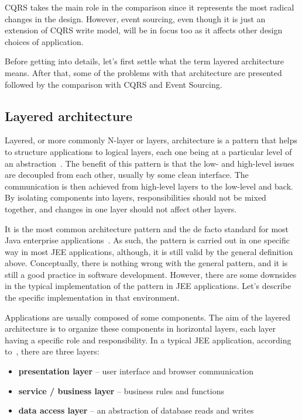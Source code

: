 \documentclass{book}
\begin{document}
CQRS takes the main role in the comparison since it represents the most
radical changes in the design. However, event sourcing, even though it
is just an extension of CQRS write model, will be in focus too as it
affects other design choices of application.

Before getting into details, let's first settle what the term layered
architecture means. After that, some of the problems with that
architecture are presented followed by the comparison with CQRS and
Event Sourcing.

\subsection{Layered architecture}\label{layered-architecture}

Layered, or more commonly N-layer or layers, architecture is a pattern
that helps to structure applications to logical layers, each one being
at a particular level of an abstraction~\cite{pattern-oriented}. The
benefit of this pattern is that the low- and high-level issues are
decoupled from each other, usually by some clean interface. The
communication is then achieved from high-level layers to the low-level
and back. By isolating components into layers, responsibilities should
not be mixed together, and changes in one layer should not affect other
layers.

It is the most common architecture pattern and the de facto standard for
most Java enterprise applications~\cite{oreilly}. As such, the pattern
is carried out in one specific way in most JEE applications, although,
it is still valid by the general definition above. Conceptually, there
is nothing wrong with the general pattern, and it is still a good
practice in software development. However, there are some downsides in
the typical implementation of the pattern in JEE applications. Let's
describe the specific implementation in that environment.

Applications are usually composed of some components. The aim of the
layered architecture is to organize these components in horizontal
layers, each layer having a specific role and responsibility. In a
typical JEE application, according to~\cite{javadocs}, there are three
layers:

\begin{itemize}
\tightlist
\item
  \textbf{presentation layer} -- user interface and browser
  communication
\item
  \textbf{service / business layer} -- business rules and functions
\item
  \textbf{data access layer} -- an abstraction of database reads and
  writes
\end{itemize}
\end{document}
